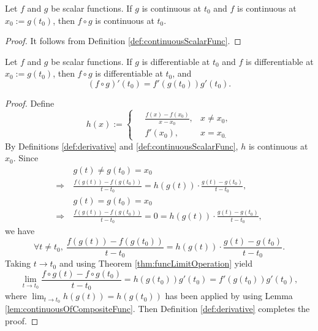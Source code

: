 \begin{lem}
  \label{lem:continuousOfCompositeFunc}
  Let $f$ and $g$ be scalar functions.
  If $g$ is continuous at $t_{0}$ and
  $f$ is continuous at $x_{0}:=g(t_{0})$, then
  $f\circ g$ is continuous at $t_{0}$.
\end{lem}
\begin{proof}
  It follows from Definition \ref{def:continuousScalarFunc}.
\end{proof}

\begin{thm}
  \label{thm:chainRuleOnScalarFunc}
  Let $f$ and $g$ be scalar functions.
  If $g$ is differentiable at $t_{0}$ and
  $f$ is differentiable at $x_{0}:=g(t_{0})$, then
  $f\circ g$ is differentiable at $t_{0}$, and
  \begin{equation}
    \label{eq:chainRuleOnScalarFunc}
    (f\circ g)'(t_{0})=f'(g(t_{0}))g'(t_{0}).
  \end{equation}
\end{thm}
\begin{proof}
  Define
  \begin{displaymath}
    h(x):=
    \left\lbrace
      \begin{aligned}
        &\ \frac{f(x)-f(x_{0})}{x-x_{0}},  &x\neq x_{0},\\
        &\ f'(x_{0}),  &x=x_{0.}
      \end{aligned}
    \right.
  \end{displaymath}
  By Definitions \ref{def:derivative} and \ref{def:continuousScalarFunc},
  $h$ is continuous at $x_{0}$. Since
  \begin{align*}
    &\ g(t)\neq g(t_{0})=x_{0}  \\
    \Rightarrow &\
    \frac{f(g(t))-f(g(t_{0}))}{t-t_{0}}
                 = h(g(t))\cdot\frac{g(t)-g(t_{0})}{t-t_{0}},\\
    &\ g(t)=g(t_{0})=x_{0}  \\
    \Rightarrow &\
    \frac{f(g(t))-f(g(t_{0}))}{t-t_{0}}=0
                  =h(g(t))\cdot \frac{g(t)-g(t_{0})}{t-t_{0}},
  \end{align*}
  we have
  \begin{displaymath}
    \forall t\neq t_{0},\
    \frac{f(g(t))-f(g(t_{0}))}{t-t_{0}}
                  =h(g(t))\cdot\frac{g(t)-g(t_{0})}{t-t_{0}}.
  \end{displaymath}
  Taking $t\rightarrow t_{0}$ and
  using Theorem \ref{thm:funcLimitOperation} yield
  \begin{displaymath}
    \lim_{t\rightarrow t_{0}}\frac{f\circ g(t)-f\circ g(t_{0})}{t-t_{0}}
    =h(g(t_{0}))g'(t_{0})=f'(g(t_{0}))g'(t_{0}),
  \end{displaymath}
  where $\lim_{t\rightarrow t_{0}}h(g(t))=h(g(t_{0}))$ has been applied
  by using Lemma \ref{lem:continuousOfCompositeFunc}.
  Then Definition \ref{def:derivative} completes the proof.
\end{proof}

